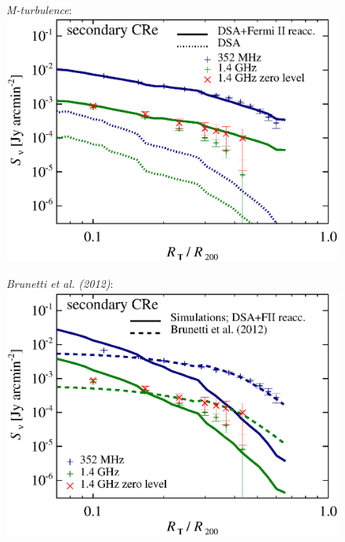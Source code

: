\documentclass[fleqn,usenatbib,useAMS]{mnras}
\newcommand{\Mflatturb}{{\it M-turbulence}\xspace}
\begin{document}
\begin{figure}
\begin{minipage}{1\columnwidth}
\begin{center}
   \end{center}
\end{minipage}
\\
\begin{minipage}{1\columnwidth}
  \begin{center}\Large{\Mflatturb:}\\ 
    \includegraphics[width=\columnwidth]{sbright.nu.DIIcomp.I0.g72a.Rad14.2400p.z0.NL.xKR.eb23.eI067.140.v6.eps}
  \end{center}
\end{minipage}
\begin{minipage}{1\columnwidth}
   \begin{center}\Large{\it Brunetti et al. (2012)}:\\
     \includegraphics[width=\columnwidth]{sbright.nu.DIIcomp.Brunetti.g72a.Rad14.2400p.z0.NL.xKR.eb23.140.v6.eps}

\end{center}
\end{minipage}
\end{figure}
\end{document}
